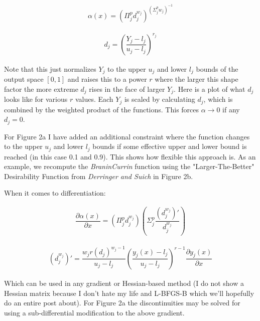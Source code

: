 \documentclass[12pt]{article}
\begin{document}
\begin{align*}
\alpha(x)=(\Pi_j^pd_j^{w_j})^{(\Sigma_j^pw_j)^{-1}}
\end{align*}

\begin{align*}
d_j=(\dfrac{Y_j-l_j}{u_j-l_j})^{r_j}
\end{align*}

\vspace{5mm}

Note that this just normalizes $Y_j$ to the upper $u_j$ and lower $l_j$ bounds of the output space $[0,1]$ and raises this to a power $r$ where the larger this shape factor the more extreme $d_j$ rises in the face of larger $Y_j$. Here is a plot of what $d_j$ looks like for various $r$ values. Each $Y_j$ is scaled by calculating $d_j$, which is combined by the weighted product of the functions. This forces $\alpha \rightarrow 0$ if any $d_j=0$. 

\vspace{5mm}

For Figure 2a I have added an additional constraint where the function changes to the upper $u_j$ and lower $l_j$ bounds if some effective upper and lower bound is reached (in this case 0.1 and 0.9). This shows how flexible this approach is. As an example, we recompute the \emph{BraninCurrin} function using the "Larger-The-Better" Desirability Function from \emph{Derringer and Suich} in Figure 2b.

\vspace{5mm}

When it comes to differentiation:

\begin{align*}
\dfrac{\partial\alpha(x)}{\partial x}=(\Pi_j^pd_j^{w_j})(\Sigma_j^p\dfrac{(d_j^{w_j})'}{d_j^{w_j}})
\end{align*}

\begin{align*}
(d_j^{w_j})'=\dfrac{w_j r (d_j)^{w_j-1}}{u_j-l_j} (\dfrac{y_j(x)-l_j}{u_j-l_j})^{r-1} \dfrac{\partial y_j(x)}{\partial x} 
\end{align*}

\vspace{5mm}

Which can be used in any gradient or Hessian-based method (I do not show a Hessian matrix because I don't hate my life and L-BFGS-B which we'll hopefully do an entire post about). For Figure 2a the discontinuities may be solved for using a sub-differential modification to the above gradient.
\end{document}
